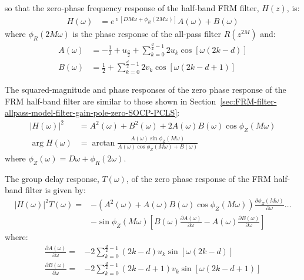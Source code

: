 \documentclass[a4paper,twoside,10pt,english]{report}
\begin{document}
so that the zero-phase frequency response of the half-band FRM filter, 
$H\left(z\right)$, is:
\begin{align*}
H\left(\omega\right)&=e^{\imath\left[DM\omega+\phi_{R}\left(2M\omega\right)\right]}
A\left(\omega\right)+B\left(\omega\right)
\end{align*}
where $\phi_{R}\left(2M\omega\right)$ is the phase response of the all-pass
filter $R\left(z^{2M}\right)$ and:
\begin{align*}
A\left(\omega\right)&=-\frac{1}{2}+u_{\frac{d}{2}}+\sum_{k=0}^{\frac{d}{2}-1}
2u_{k}\cos\left[\omega{}\left(2k-d\right)\right] \\
B\left(\omega\right)&=\frac{1}{2}+\sum_{k=0}^{\frac{d}{2}-1}
2v_{k}\cos\left[\omega{}\left(2k-d+1\right)\right]
\end{align*}

The squared-magnitude and phase responses of the zero phase response of the 
FRM half-band filter are similar to those shown in 
Section~\ref{sec:FRM-filter-allpass-model-filter-gain-pole-zero-SOCP-PCLS}:
\begin{align*}
\left|H\left(\omega\right)\right|^{2}&=
A^{2}\left(\omega\right)+B^{2}\left(\omega\right) +
2A\left(\omega\right)B\left(\omega\right)\cos\phi_{Z}\left(M\omega\right)\\
\arg H\left(\omega\right) &= \arctan \frac{
A\left(\omega\right)\sin\phi_{Z}\left(M\omega\right)}{
A\left(\omega\right)\cos\phi_{Z}\left(M\omega\right) + B\left(\omega\right)}
\end{align*}
where $\phi_{Z}\left(\omega\right)=D\omega + \phi_{R}\left(2\omega\right)$.

The group delay response, $T\left(\omega\right)$, of the zero phase response 
of the FRM half-band filter is given by:
\begin{align*}
  \left|H\left(\omega\right)\right|^{2}T\left(\omega\right)
  =& -\left(A^{2}\left(\omega\right)+A\left(\omega\right)B\left(\omega\right)
  \cos\phi_{Z}\left(M\omega\right)\right)
  \frac{\partial\phi_{Z}\left(M\omega\right)}{\partial\omega} \hdots \\
   & -\sin\phi_{Z}\left(M\omega\right)\left[
     B\left(\omega\right)\frac{\partial A\left(\omega\right)}{\partial\omega}-
     A\left(\omega\right)\frac{\partial B\left(\omega\right)}{\partial\omega}
     \right]
\end{align*}
where:
\begin{align*}
  \frac{\partial A\left(\omega\right)}{\partial\omega} =
  & -2\sum_{k=0}^{\frac{d}{2}-1}\left(2k-d\right)u_{k}
    \sin\left[\omega{}\left(2k-d\right)\right] \\
  \frac{\partial B\left(\omega\right)}{\partial\omega} =
  & -2\sum_{k=0}^{\frac{d}{2}-1}\left(2k-d+1\right)v_{k}
    \sin\left[\omega{}\left(2k-d+1\right)\right]
\end{align*}
\end{document}
